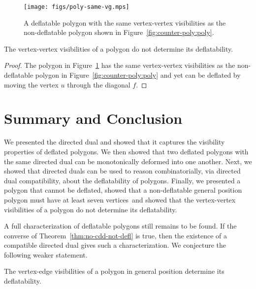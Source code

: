 \documentclass{amsart}
\begin{document}
\fi


\begin{figure}[htb]
  \centering
  \texttt{[image: figs/poly-same-vg.mps]}
  \caption{A deflatable polygon with the same vertex-vertex
    visibilities as the non-deflatable polygon shown in
    Figure~\ref{fig:counter-poly:poly}.}
  \label{fig:def-poly-same-vis}
\end{figure}

\begin{theorem}
  The vertex-vertex visibilities of a polygon do not determine its
  deflatability.
\end{theorem}
\begin{proof}
  The polygon in Figure~\ref{fig:def-poly-same-vis} has the same
  vertex-vertex visibilities as the non-deflatable polygon in
  Figure~\ref{fig:counter-poly:poly} and yet can be deflated by moving
  the vertex $u$ through the diagonal $f$.
\end{proof}


\section{Summary and Conclusion}

We presented the directed dual and showed that it captures the
visibility properties of deflated polygons.  We then showed that two
deflated polygons with the same directed dual can be monotonically
deformed into one another.  Next, we showed that directed duals can be
used to reason combinatorially, via directed dual compatibility, about
the deflatability of polygons.  Finally, we presented a polygon that
cannot be deflated\iffullversion , showed that a non-deflatable
general position polygon must have at least seven vertices\fi\ and
showed that the vertex-vertex visibilities of a polygon do not
determine its deflatability.

A full characterization of deflatable polygons still remains to be
found.  If the converse of Theorem~\ref{thm:no-cdd-not-defl} is true,
then the existence of a compatible directed dual gives such a
characterization.  We conjecture the following weaker statement.

\begin{conj}
  The vertex-edge visibilities of a polygon in general position
  determine its deflatability.
\end{conj}
\end{document}
